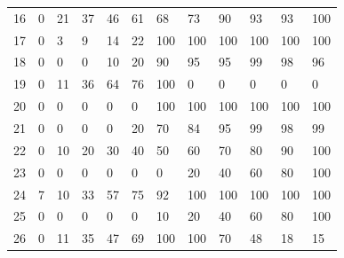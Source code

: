 \documentclass[a4paper]{thesis}
\begin{document}
\begin{table}[H]
\begin{tabular}{l|lllllllllll}
16 & 0 & 21 & 37 & 46 & 61 & 68 & 73 & 90 & 93 & 93 & 100 \\
17 & 0 & 3 & 9 & 14 & 22 & 100 & 100 & 100 & 100 & 100 & 100 \\
18 & 0 & 0 & 0 & 10 & 20 & 90 & 95 & 95 & 99 & 98 & 96 \\
19 & 0 & 11 & 36 & 64 & 76 & 100 & 0 & 0 & 0 & 0 & 0 \\
20 & 0 & 0 & 0 & 0 & 0 & 100 & 100 & 100 & 100 & 100 & 100 \\
21 & 0 & 0 & 0 & 0 & 20 & 70 & 84 & 95 & 99 & 98 & 99 \\
22 & 0 & 10 & 20 & 30 & 40 & 50 & 60 & 70 & 80 & 90 & 100 \\
23 & 0 & 0 & 0 & 0 & 0 & 0 & 20 & 40 & 60 & 80 & 100 \\
24 & 7 & 10 & 33 & 57 & 75 & 92 & 100 & 100 & 100 & 100 & 100 \\
25 & 0 & 0 & 0 & 0 & 0 & 10 & 20 & 40 & 60 & 80 & 100 \\
26 & 0 & 11 & 35 & 47 & 69 & 100 & 100 & 70 & 48 & 18 & 15 \\
\end{tabular}
\end{table}
\end{document}
